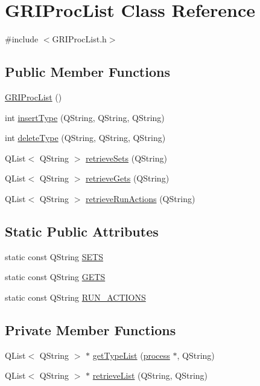 \hypertarget{classGRIProcList}{\section{\-G\-R\-I\-Proc\-List \-Class \-Reference}
\label{classGRIProcList}
}


{\ttfamily \#include $<$\-G\-R\-I\-Proc\-List.\-h$>$}

\subsection*{\-Public \-Member \-Functions}
\begin{DoxyCompactItemize}
\item 
\hyperlink{classGRIProcList_acfefde50634e2fe2404ed8c412401e78}{\-G\-R\-I\-Proc\-List} ()
\item 
int \hyperlink{classGRIProcList_a0f78c4cf651b47f4e97a5bef20a9e664}{insert\-Type} (\-Q\-String, \-Q\-String, \-Q\-String)
\item 
int \hyperlink{classGRIProcList_ad68f20d0997381196676b0d762e42184}{delete\-Type} (\-Q\-String, \-Q\-String, \-Q\-String)
\item 
\-Q\-List$<$ \-Q\-String $>$ \hyperlink{classGRIProcList_a59e4a85573205889961e07e6a35c9040}{retrieve\-Sets} (\-Q\-String)
\item 
\-Q\-List$<$ \-Q\-String $>$ \hyperlink{classGRIProcList_a3f00c71359b30dfbccc0fe66034585b3}{retrieve\-Gets} (\-Q\-String)
\item 
\-Q\-List$<$ \-Q\-String $>$ \hyperlink{classGRIProcList_ab62aa8493e541993b72e8a9b0872fbe3}{retrieve\-Run\-Actions} (\-Q\-String)
\end{DoxyCompactItemize}
\subsection*{\-Static \-Public \-Attributes}
\begin{DoxyCompactItemize}
\item 
static const \-Q\-String \hyperlink{classGRIProcList_a17ea902e8a8383c6b9351b0271eba0e8}{\-S\-E\-T\-S}
\item 
static const \-Q\-String \hyperlink{classGRIProcList_abfd9e04ccff19dba6e86461f3407c228}{\-G\-E\-T\-S}
\item 
static const \-Q\-String \hyperlink{classGRIProcList_a9c5625a4111675df608616ba83662ad5}{\-R\-U\-N\-\_\-\-A\-C\-T\-I\-O\-N\-S}
\end{DoxyCompactItemize}
\subsection*{\-Private \-Member \-Functions}
\begin{DoxyCompactItemize}
\item 
\-Q\-List$<$ \-Q\-String $>$ $\ast$ \hyperlink{classGRIProcList_a7fc7a01dcc351e30e51bb6b08e1024b1}{get\-Type\-List} (\hyperlink{structprocess}{process} $\ast$, \-Q\-String)
\item 
\-Q\-List$<$ \-Q\-String $>$ $\ast$ \hyperlink{classGRIProcList_aca20903dd26f91e7c1c43e7b06605b89}{retrieve\-List} (\-Q\-String, \-Q\-String)
\end{DoxyCompactItemize}
